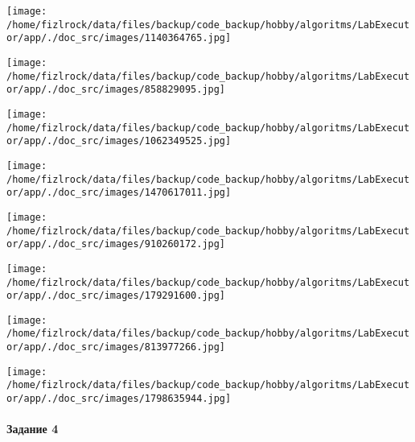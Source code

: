 \documentclass[a4paper, 12pt]{article}
\begin{document}
\texttt{[image: /home/fizlrock/data/files/backup/code\_backup/hobby/algoritms/LabExecutor/app/./doc\_src/images/1140364765.jpg]}

\texttt{[image: /home/fizlrock/data/files/backup/code\_backup/hobby/algoritms/LabExecutor/app/./doc\_src/images/858829095.jpg]}

\texttt{[image: /home/fizlrock/data/files/backup/code\_backup/hobby/algoritms/LabExecutor/app/./doc\_src/images/1062349525.jpg]}

\texttt{[image: /home/fizlrock/data/files/backup/code\_backup/hobby/algoritms/LabExecutor/app/./doc\_src/images/1470617011.jpg]}

\texttt{[image: /home/fizlrock/data/files/backup/code\_backup/hobby/algoritms/LabExecutor/app/./doc\_src/images/910260172.jpg]}

\texttt{[image: /home/fizlrock/data/files/backup/code\_backup/hobby/algoritms/LabExecutor/app/./doc\_src/images/179291600.jpg]}

\texttt{[image: /home/fizlrock/data/files/backup/code\_backup/hobby/algoritms/LabExecutor/app/./doc\_src/images/813977266.jpg]}

\texttt{[image: /home/fizlrock/data/files/backup/code\_backup/hobby/algoritms/LabExecutor/app/./doc\_src/images/1798635944.jpg]}
\pagebreak
\paragraph{Задание 4}
\end{document}
